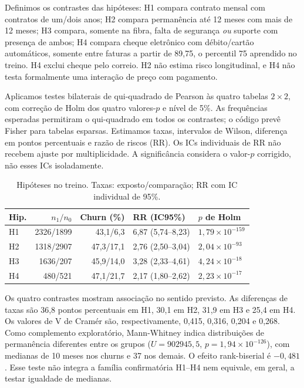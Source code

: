 \documentclass[12pt]{article}
\begin{document}
Definimos os contrastes das hipóteses: H1 compara contrato mensal com contratos de um/dois anos; H2 compara permanência até 12 meses com mais de 12 meses; H3 compara, somente na fibra, falta de segurança \emph{ou} suporte com presença de ambos; H4 compara cheque eletrônico com débito/cartão automáticos, somente entre faturas a partir de 89,75, o percentil 75 aprendido no treino. H4 exclui cheque pelo correio. H2 não estima risco longitudinal, e H4 não testa formalmente uma interação de preço com pagamento.

Aplicamos testes bilaterais de qui-quadrado de Pearson às quatro tabelas $2\times2$, com correção de Holm dos quatro valores-$p$ e nível de 5\%. As frequências esperadas permitiram o qui-quadrado em todos os contrastes; o código prevê Fisher para tabelas esparsas. Estimamos taxas, intervalos de Wilson, diferença em pontos percentuais e razão de riscos (RR). Os ICs individuais de RR não recebem ajuste por multiplicidade. A significância considera o valor-$p$ corrigido, não esses ICs isoladamente.

\begin{table}[htbp]
\centering\small
\caption{Hipóteses no treino. Taxas: exposto/comparação; RR com IC individual de 95\%.}
\label{tab:hipoteses}
\begin{tabular}{lrrll}\toprule
Hip. & $n_1/n_0$ & Churn (\%) & RR (IC95\%) & $p$ de Holm\\\midrule
H1 & 2326/1899 & 43,1/6,3 & 6,87 (5,74--8,23) & $1,79\times10^{-159}$ \\
H2 & 1318/2907 & 47,3/17,1 & 2,76 (2,50--3,04) & $2,04\times10^{-93}$ \\
H3 & 1636/207 & 45,9/14,0 & 3,28 (2,33--4,61) & $4,24\times10^{-18}$ \\
H4 & 480/521 & 47,1/21,7 & 2,17 (1,80--2,62) & $2,23\times10^{-17}$ \\
\bottomrule\end{tabular}
\end{table}

Os quatro contrastes mostram associação no sentido previsto. As diferenças de taxas são 36,8 pontos percentuais em H1, 30,1 em H2, 31,9 em H3 e 25,4 em H4. Os valores de V de Cramér são, respectivamente, 0,415, 0,316, 0,204 e 0,268. Como complemento exploratório, Mann-Whitney indica distribuições de permanência diferentes entre os grupos ($U=902945{,}5$, $p=1{,}94\times10^{-126}$), com medianas de 10 meses nos churns e 37 nos demais. O efeito rank-biserial é $-0{,}481$. Esse teste não integra a família confirmatória H1--H4 nem equivale, em geral, a testar igualdade de medianas.
\end{document}
